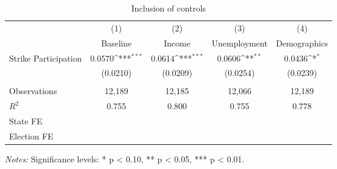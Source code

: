 \documentclass[11pt, a4paper]{article} %
\begin{document}
\begin{table}[H]\centering
	\begin{threeparttable}
		\caption{Inclusion of controls}\label{tab_greta_cons:inclusion_controls}
		{\def\sym#1{\ifmmode^{#1}\else\(^{#1}\)\fi} 
			\begin{tabular}{l*{4}{c}}
				\toprule
				&\multicolumn{1}{c}{(1)}&\multicolumn{1}{c}{(2)}&\multicolumn{1}{c}{(3)}&\multicolumn{1}{c}{(4)}\\
				& Baseline & Income & Unemployment &  Demographics \\
				\midrule
				Strike Participation    &      0.0570\sym{***}&      0.0614\sym{***}&      0.0606\sym{**} &      0.0436\sym{*}  \\
				&    (0.0210)         	&    (0.0209)         &    (0.0254)         &    (0.0239)         \\
				\\
				Observations        	&      12,189         &      12,185         &      12,066         &      12,189         \\
				$R^2$              		&       0.755         &       0.800         &       0.755         &       0.778         \\			
				State FE				& \checkmark 		  & \checkmark       & \checkmark 	& \checkmark \\
				Election FE				& \checkmark 		  & \checkmark       & \checkmark   & \checkmark \\
				\bottomrule
		\end{tabular}}
		\begin{tablenotes} 
			\item \scriptsize \emph{Notes:}  \newline Significance levels: * p < 0.10, ** p < 0.05, *** p < 0.01.
		\end{tablenotes} 
	\end{threeparttable}
\end{table}
\end{document}
